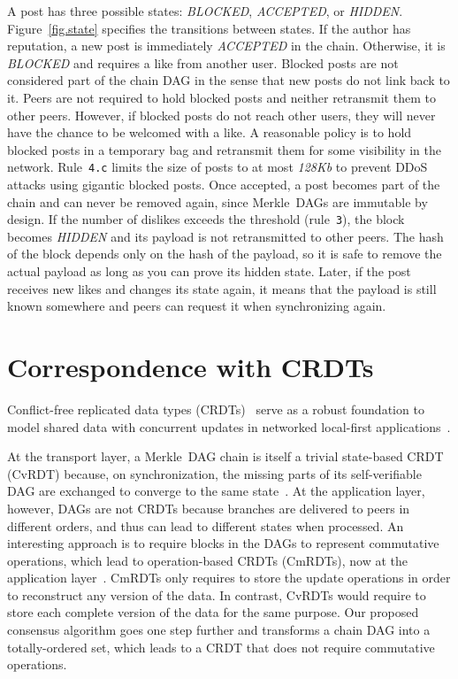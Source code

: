 \documentclass[10pt,journal,compsoc]{IEEEtran}
\begin{document}
A post has three possible states: \emph{BLOCKED}, \emph{ACCEPTED}, or
\emph{HIDDEN}.
Figure~\ref{fig.state} specifies the transitions between states.
%
If the author has reputation, a new post is immediately \emph{ACCEPTED} in the
chain.
Otherwise, it is \emph{BLOCKED} and requires a like from another user.
Blocked posts are not considered part of the chain DAG in the sense that new
posts do not link back to it.
%
Peers are not required to hold blocked posts and neither retransmit them to
other peers.
However, if blocked posts do not reach other users, they will never have the
chance to be welcomed with a like.
A reasonable policy is to hold blocked posts in a temporary bag and retransmit
them for some visibility in the network.
Rule~\texttt{4.c} limits the size of posts to at most \emph{128Kb} to prevent
DDoS attacks using gigantic blocked posts.
%
Once accepted, a post becomes part of the chain and can never be removed
again, since Merkle~DAGs are immutable by design.
%
If the number of dislikes exceeds the threshold (rule~\texttt{3}), the block
becomes \emph{HIDDEN} and its payload is not retransmitted to other peers.
The hash of the block depends only on the hash of the payload, so it is safe to
remove the actual payload as long as you can prove its hidden state.
Later, if the post receives new likes and changes its state again, it means
that the payload is still known somewhere and peers can request it when
synchronizing again.

\section{Correspondence with CRDTs}
\label{sec.crdts}

Conflict-free replicated data types (CRDTs)~\cite{p2p.crdts} serve as a robust
foundation to model shared data with concurrent updates in networked
local-first applications~\cite{p2p.local}.

At the transport layer, a Merkle~DAG chain is itself a trivial state-based CRDT
(CvRDT) because, on synchronization, the missing parts of its self-verifiable
DAG are exchanged to converge to the same state~\cite{p2p.merkle-crdts}.
%
At the application layer, however, DAGs are not CRDTs because branches are
delivered to peers in different orders, and thus can lead to different states
when processed.
%
An interesting approach is to require blocks in the DAGs to represent
commutative operations, which lead to operation-based CRDTs (CmRDTs), now at
the application layer~\cite{p2p.merkle-crdts}.
%
CmRDTs only requires to store the update operations in order to reconstruct any
version of the data.
In contrast, CvRDTs would require to store each complete version of the data
for the same purpose.
%
Our proposed consensus algorithm goes one step further and transforms a chain
DAG into a totally-ordered set, which leads to a CRDT that does not require
commutative operations.
\end{document}

